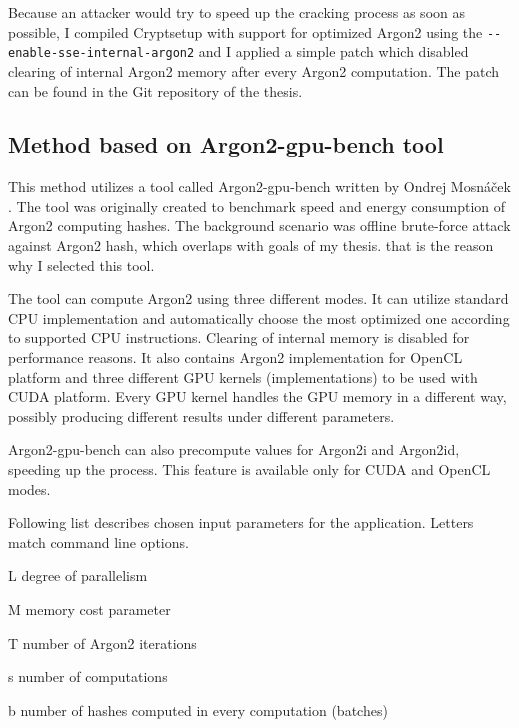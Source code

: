\documentclass[nolof]{fithesis3}
\begin{document}
Because an attacker would try to speed up the cracking process as soon as possible, I compiled Cryptsetup with support for optimized Argon2 using the \verb+--enable-sse-internal-argon2+ and I applied a simple patch which disabled clearing of internal Argon2 memory after every Argon2 computation. The patch can be found in the Git repository of the thesis.

\subsection{Method based on Argon2-gpu-bench tool}
This method utilizes a tool called Argon2-gpu-bench written by Ondrej Mosnáček \parencite{argon2gpu}. The tool was originally created to benchmark speed and energy consumption of Argon2 computing hashes. The background scenario was offline brute-force attack against Argon2 hash, which overlaps with goals of my thesis. that is the reason why I selected this tool.

The tool can compute Argon2 using three different modes. It can utilize standard CPU implementation and automatically choose the most optimized one according to supported CPU instructions. Clearing of internal memory is disabled for performance reasons. It also contains Argon2 implementation for OpenCL platform and three different GPU kernels (implementations) to be used with CUDA platform. Every GPU kernel handles the GPU memory in a different way, possibly producing different results under different parameters.

Argon2-gpu-bench can also precompute values for Argon2i and Argon2id, speeding up the process. This feature is available only for CUDA and OpenCL modes.

Following list describes chosen input parameters for the application. Letters match command line options.

\begin{description}
\item{L} degree of parallelism

\item{M} memory cost parameter

\item{T} number of Argon2 iterations

\item{s} number of computations

\item{b} number of hashes computed in every computation (batches)
\end{description}
\end{document}
